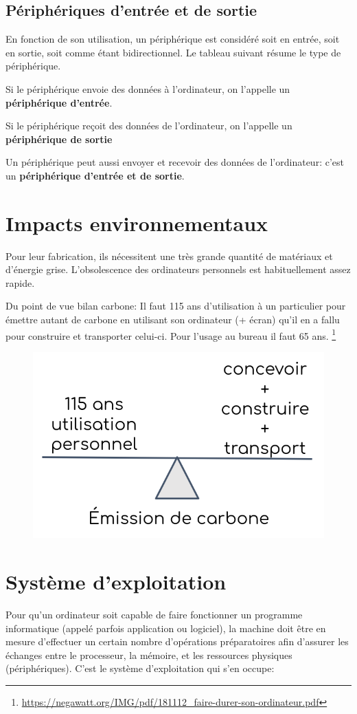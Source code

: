 \documentclass[11pt, a4paper]{book}
\begin{document}
\subsection{Périphériques d'entrée et de sortie}

En fonction de son utilisation, un périphérique est considéré soit en entrée, soit en sortie, soit comme étant bidirectionnel. Le tableau suivant résume le type de périphérique.

Si le périphérique envoie des données à l'ordinateur, on l'appelle un {\bf périphérique d'entrée}.

Si le périphérique reçoit des données de l'ordinateur, on l'appelle un {\bf périphérique de sortie}

Un périphérique peut aussi envoyer et recevoir des données de l'ordinateur: c'est un {\bf périphérique d'entrée et de sortie}.

\section{Impacts environnementaux}
Pour leur fabrication, ils nécessitent une très grande quantité de matériaux et d’énergie grise.
L'obsolescence des ordinateurs personnels est habituellement assez rapide.

Du point de vue bilan carbone: Il faut 115 ans d’utilisation à un particulier pour émettre autant de carbone en utilisant son ordinateur (+ écran) qu’il en a fallu pour construire et transporter celui-ci.
Pour l’usage au bureau il faut 65 ans.
\footnote{\url{https://negawatt.org/IMG/pdf/181112_faire-durer-son-ordinateur.pdf}}
\begin{figure}[h!]
    \centering
    \includegraphics[width=0.3\linewidth]{images/impact_hardware.png}
\end{figure}

\section{Système d'exploitation}

Pour qu’un ordinateur soit capable de faire fonctionner un programme informatique (appelé parfois application ou logiciel), la machine doit être en mesure d’effectuer un certain nombre d’opérations préparatoires afin d’assurer les échanges entre le processeur, la mémoire, et les ressources physiques (périphériques). C'est le système d'exploitation qui s'en occupe:
\end{document}
